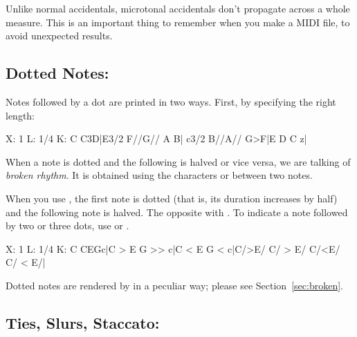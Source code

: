 \documentclass[a4paper,fullpage,12pt]{book}
\begin{document}

\begin{note}
  
  Unlike normal accidentals, microtonal accidentals don't propagate
  across a whole measure. This is an important thing to remember 
  when you make a MIDI file, to avoid unexpected results.
 
\end{note}


\subsection{Dotted Notes: \icmd{\textless{} \textgreater{}}}

Notes followed by a dot are printed in two ways. First, by specifying
the right length:

\begin{abcsource}
X: 1
L: 1/4
K: C
C3D|E3/2 F//G// A B| c3/2 B//A// G>F|E D C z|
\end{abcsource}


When a note is dotted and the following is halved or vice versa, we
are talking of \emph{broken rhythm}. It is obtained using the
characters \car{\textgreater} or \car{\textless} between two notes.

When you use \car{\textgreater}, the first note is dotted (that is,
its duration increases by half) and the following note is halved. The
opposite with \car{\textless}. To indicate a note followed by two or
three dots, use \car{\textgreater\textgreater} or
\car{\textgreater\textgreater\textgreater}.

\begin{abcsource}
X: 1
L: 1/4
K: C
CEGc|C > E G >> c|C < E G < c|C/>E/ C/ > E/ C/<E/ C/ < E/|
\end{abcsource}


\begin{note}
  
  Dotted notes are rendered by \abcmid{} in a peculiar way; please see
  Section~\ref{sec:broken}.
  
\end{note}


\subsection{Ties, Slurs, Staccato: }
\end{document}
